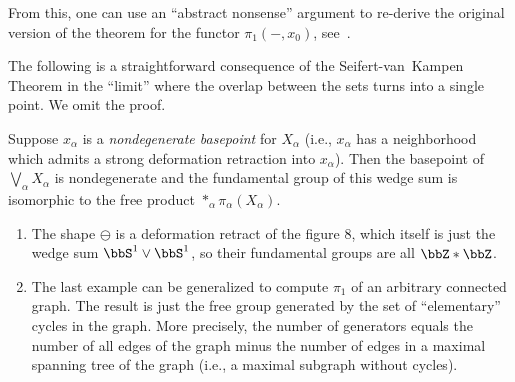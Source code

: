 From this, one can use an ``abstract nonsense'' argument to re-derive the original version of the theorem for the functor $\pi_1(-,x_0)$, see~\cite[\S 2.7]{May}.

The following is a straightforward consequence of the Seifert-van~Kampen Theorem in the ``limit'' where the overlap between the sets turns into a single point. We omit the proof.

\begin{cor}
    Suppose $x_\alpha$ is a \emph{nondegenerate basepoint} for $X_\alpha$ (i.e., $x_\alpha$ has a neighborhood which admits a strong deformation retraction into $x_\alpha$). Then the basepoint of $\bigvee_{\alpha }X_\alpha$ is nondegenerate and the fundamental group of this wedge sum is isomorphic to the free product $\ast_{\alpha}\pi_\alpha(X_\alpha)$.
\end{cor}


\begin{example}
\begin{enumerate}
    \item The shape $\ominus$ is a deformation retract of the figure 8, which itself is just the wedge sum $\bbS^1\vee \bbS^1$, so their fundamental groups are all $\bbZ\ast\bbZ$.
    \item The last example can be generalized to compute $\pi_1$ of an arbitrary connected graph. The result is just the free group generated by the set of ``elementary'' cycles in the graph. More precisely, the number of generators equals the number of all edges of the graph minus the number of edges in a maximal spanning tree of the graph (i.e., a maximal subgraph without cycles).
\end{enumerate}
\end{example}


